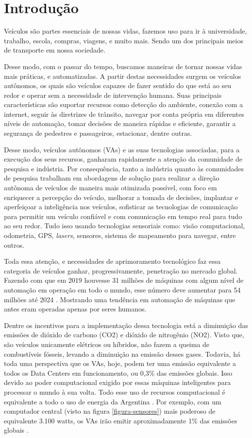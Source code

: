 \documentclass[
	12pt,				%
	openany, %
	a4paper,			%
	english,			%
	french,				%
	spanish,			%
	brazil				%
	]{abntex2}
\begin{document}
\chapter*[Introdução]{Introdução}
Veículos são partes essenciais de nossas vidas, fazemos uso para ir à universidade, trabalho, escola, compras, viagens, e muito mais. Sendo um dos principais meios de transporte em nossa sociedade.

Desse modo, com o passar do tempo, buscamos maneiras de tornar nossas vidas mais práticas, e automatizadas. A partir destas necessidades surgem os veículos autônomos, os quais são veículos capazes de fazer sentido do que está ao seu redor e operar sem a necessidade de intervenção humana. Suas principais características são suportar recursos como detecção do ambiente, conexão com a internet, seguir às diretrizes de trânsito, navegar por conta própria em diferentes níveis de automação, tomar decisões de maneira rápidas e eficiente, garantir a segurança de pedestres e passageiros, estacionar, dentre outras.

Desse modo, veículos autônomos (VAs) e as suas tecnologias associadas, para a execução dos seus recursos, ganharam rapidamente a atenção da comunidade de pesquisa e indústria. Por consequência, tanto a indústria quanto às comunidades de pesquisa trabalham em abordagens de solução para realizar a direção autônoma de veículos de maneira mais otimizada possível, com foco em enriquecer a percepção do veículo, melhorar a tomada de decisões, implantar e aperfeiçoar a inteligência nos veículos, sofisticar as tecnologias de comunicação para permitir um veículo confiável e com comunicação em tempo real para tudo ao seu redor. Tudo isso usando tecnologias sensoriais como: visão computacional, odometria, GPS, \textit{lasers}, sensores, sistema de mapeamento para navegar, entre outros.

Toda essa atenção, e necessidades de aprimoramento tecnológico faz essa categoria de veículos ganhar, progressivamente, penetração no mercado global. Fazendo com que em 2019 houvesse 31 milhões de máquinas com algum nível de automação em operação em todo o mundo, esse número deve aumentar para 54 milhões até 2024 \cite{sensors}. Mostrando uma tendência em automação de máquinas que antes eram operadas apenas por seres humanos.

Dentre os incentivos para a implementação dessa tecnologia está a diminuição das emissões de dióxido de carbono (CO2) e dióxido de nitrogênio (NO2). Visto que, são veículos unicamente elétricos ou híbridos, não fazem a queima de combustíveis fósseis, levando a diminuição na emissão desses gases. Todavia, há toda uma perspectiva que os VAs, hoje, podem ter uma emissão equivalente a todos os Data Centers em funcionamento, ou 0,3\% das emissões globais. Isso devido ao poder computacional exigido por essas máquinas inteligentes para processar o mundo à sua volta. Todo esse uso de recursos computacional é equivalente a todo o uso de energia da Argentina \cite{intro-pm}. Por exemplo, com um computador central (visto na figura \ref{figura-sensores}) mais poderoso de equivalente 3.100 watts, os VAs irão emitir aproximadamente 1\% das emissões globais \cite{intro-pm}.
\end{document}
